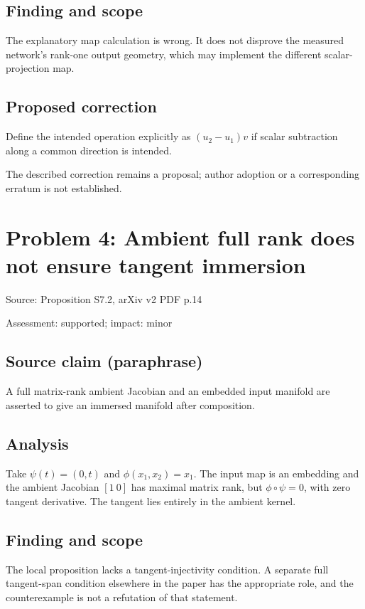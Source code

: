\documentclass[11pt]{article}
\begin{document}
\subsection*{Finding and scope}

The explanatory map calculation is wrong. It does not disprove the measured network’s rank-one output geometry, which may implement the different scalar-projection map.

\subsection*{Proposed correction}

Define the intended operation explicitly as \((u_2-u_1)v\) if scalar subtraction along a common direction is intended.

The described correction remains a proposal; author adoption or a corresponding erratum is not established.

\section*{Problem 4: Ambient full rank does not ensure tangent immersion}

Source: Proposition S7.2, arXiv v2 PDF p.14

Assessment: supported; impact: minor

\subsection*{Source claim (paraphrase)}

A full matrix-rank ambient Jacobian and an embedded input manifold are asserted to give an immersed manifold after composition.

\subsection*{Analysis}

Take \(\psi(t)=(0,t)\) and \(\phi(x_1,x_2)=x_1\). The input map is an embedding and the ambient Jacobian \([1\ 0]\) has maximal matrix rank, but \(\phi\circ\psi=0\), with zero tangent derivative. The tangent lies entirely in the ambient kernel.

\subsection*{Finding and scope}

The local proposition lacks a tangent-injectivity condition. A separate full tangent-span condition elsewhere in the paper has the appropriate role, and the counterexample is not a refutation of that statement.
\end{document}
